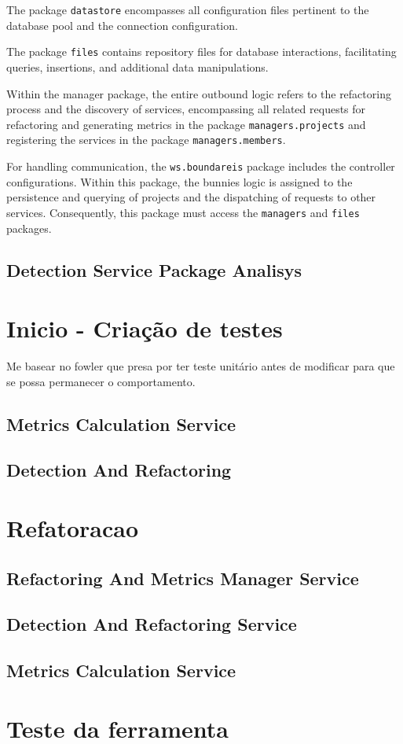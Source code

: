 The package \verb|datastore| encompasses all configuration files pertinent to the database pool and the connection configuration.

The package \verb|files| contains repository files for database interactions, facilitating queries, insertions, and additional data manipulations.

Within the manager package, the entire outbound logic refers to the refactoring process and the discovery of services, encompassing all related requests for refactoring and generating metrics in the package \verb|managers.projects| and registering the services in the package \verb|managers.members|.

For handling communication, the \verb|ws.boundareis| package includes the controller configurations. Within this package, the bunnies logic is assigned to the persistence and querying of projects and the dispatching of requests to other services. Consequently, this package must access the \verb|managers| and \verb|files| packages.

\subsection{Detection Service Package Analisys}
 
\section{Inicio - Criação de testes}

Me basear no fowler que presa por ter teste unitário antes de modificar para que se possa permanecer o comportamento.

\subsection{Metrics Calculation Service}

\subsection{Detection And Refactoring}

\section{Refatoracao}

\subsection{Refactoring And Metrics Manager Service}

\subsection{Detection And Refactoring Service}

\subsection{Metrics Calculation Service}

\section{Teste da ferramenta}